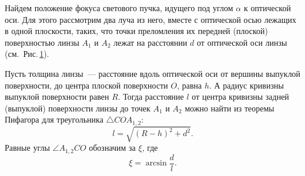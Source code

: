 \begin{figure}[h]
    \caption{}
    \label{pic:optical-aberrations-coma1}
\end{figure}

Найдем положение фокуса светового пучка, идущего под углом $\alpha$ к оптической оси. Для этого рассмотрим два луча из него, вместе с оптической осью лежащих в одной плоскости, таких, что точки преломления их передней (плоской) поверхностью линзы $A_1$ и $A_2$ лежат на расстоянии $d$ от оптической оси линзы (см.~Рис.\,\ref{pic:optical-aberrations-coma1}).

Пусть толщина линзы~--- расстояние вдоль оптической оси от вершины выпуклой поверхности, до центра плоской поверхности $O$, равна $h$. А радиус кривизны выпуклой поверхности равен $R$. Тогда расстояние $l$ от центра кривизны задней (выпуклой) поверхности линзы до точек $A_1$ и $A_2$ можно найти из теоремы Пифагора для треугольника $\triangle COA_{1,2}$:
\begin{equation*}
    l = \sqrt{(R - h)^2 + d^2}.
\end{equation*}
Равные углы $\angle A_{1,2} C O$ обозначим за $\xi$, где
\begin{equation*}
    \xi = \arcsin \frac{d}{l}.
\end{equation*}

